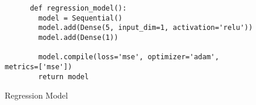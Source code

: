 \begin{figure}
  \begin{code}
    \begin{verbatim}
      def regression_model():
        model = Sequential()
        model.add(Dense(5, input_dim=1, activation='relu'))
        model.add(Dense(1))

        model.compile(loss='mse', optimizer='adam', metrics=['mse'])
        return model
    \end{verbatim}
    \caption{Regression Model}
    \label{code:regression_model}
  \end{code}
\end{figure}